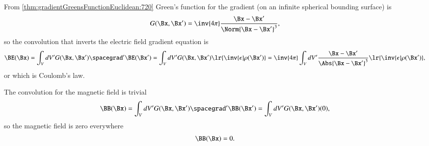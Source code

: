 %
%
From \cref{thm:gradientGreensFunctionEuclidean:720}
 Green's function for the gradient (on an infinite spherical bounding surface) is
\begin{dmath}\label{eqn:electrostatics_invertingGradient:260}
G(\Bx, \Bx') = \inv{4 \pi} \frac{\Bx - \Bx'}{\Norm{\Bx - \Bx'}^3},
\end{dmath}
so the convolution that inverts the electric field gradient equation is
\begin{dmath}\label{eqn:electrostatics_invertingGradient:621}
\BE(\Bx)
= \int_V dV' G(\Bx, \Bx') \spacegrad' \BE(\Bx')
= \int_V dV' G(\Bx, \Bx') \lr{ \inv{\epsilon}\rho(\Bx') }
= \inv{4\pi} \int_V dV' \frac{\Bx - \Bx'}{ \Abs{\Bx - \Bx'}^3 } \lr{ \inv{\epsilon}\rho(\Bx') },
\end{dmath}
or
which is Coulomb's law.

The convolution for the magnetic field is trivial
\begin{dmath}\label{eqn:electrostatics_invertingGradient:641}
\BB(\Bx)
= \int_V dV' G(\Bx, \Bx') \spacegrad' \BB(\Bx')
= \int_V dV' G(\Bx, \Bx') (0),
\end{dmath}
so the magnetic field is zero everywhere
\begin{dmath}\label{eqn:electrostatics_invertingGradient:320}
\BB(\Bx) = 0.
\end{dmath}


